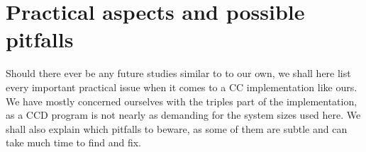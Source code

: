\documentclass[10pt,twoside]{report}
\begin{document}
	\section{Practical aspects and possible pitfalls}
	Should there ever be any future studies similar to to our own, we shall here list every important practical issue when it comes to a CC implementation like ours. We have mostly concerned ourselves with the triples part of the implementation, as a CCD program is not nearly as demanding for the system sizes used here. We shall also explain which pitfalls to beware, as some of them are subtle and can take much time to find and fix. 
	

\end{document}

